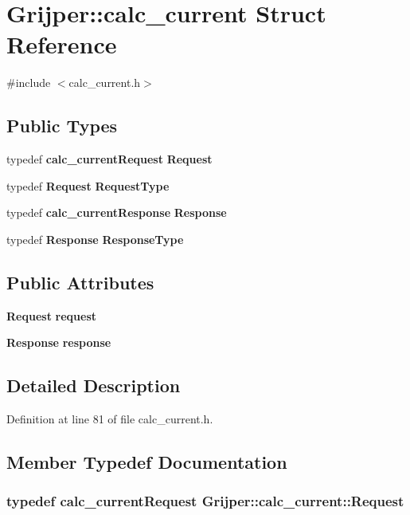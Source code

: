 \section{Grijper\-:\-:calc\-\_\-current Struct Reference}
\label{structGrijper_1_1calc__current}


{\ttfamily \#include $<$calc\-\_\-current.\-h$>$}

\subsection*{Public Types}
\begin{DoxyCompactItemize}
\item 
typedef {\bf calc\-\_\-current\-Request} {\bf Request}
\item 
typedef {\bf Request} {\bf Request\-Type}
\item 
typedef {\bf calc\-\_\-current\-Response} {\bf Response}
\item 
typedef {\bf Response} {\bf Response\-Type}
\end{DoxyCompactItemize}
\subsection*{Public Attributes}
\begin{DoxyCompactItemize}
\item 
{\bf Request} {\bf request}
\item 
{\bf Response} {\bf response}
\end{DoxyCompactItemize}


\subsection{Detailed Description}


Definition at line 81 of file calc\-\_\-current.\-h.



\subsection{Member Typedef Documentation}
\subsubsection[{Request}]{\setlength{\rightskip}{0pt plus 5cm}typedef {\bf calc\-\_\-current\-Request} {\bf Grijper\-::calc\-\_\-current\-::\-Request}}\label{structGrijper_1_1calc__current_a5040b8d389c1eea2cfd45a6b4e96b967}


